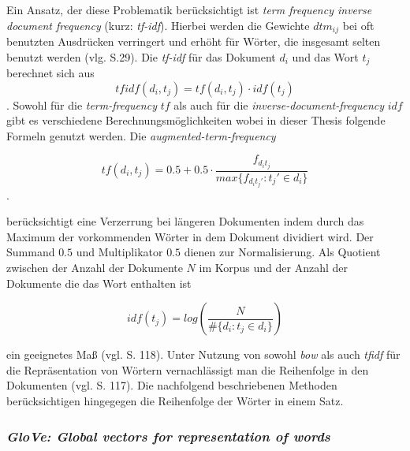 \documentclass[a4paper,11pt]{article}
\begin{document}
Ein Ansatz, der diese Problematik berücksichtigt ist \textit{term frequency inverse document frequency} (kurz: \textit{tf-idf}). Hierbei werden die Gewichte $dtm_{ij}$  bei oft benutzten Ausdrücken verringert und erhöht für Wörter, die insgesamt selten benutzt werden (vlg. \cite{textMiningR} S.29). Die \textit{tf-idf} für das Dokument $d_i$ und das Wort $t_j$ berechnet sich aus 
\[tfidf(d_i, t_j) = tf(d_i,t_j) \cdot idf(t_j)  \].
Sowohl für die \textit{term-frequency} $tf$ als auch für die \textit{inverse-document-frequency} $idf$ gibt es verschiedene Berechnungsmöglichkeiten wobei in dieser Thesis folgende Formeln genutzt werden.
Die \textit{augmented-term-frequency}

\[tf(d_i,t_j) = 0.5 +  0.5 \cdot \frac{f_{d_i t_j}}{max \{ f_{d_i t_j'}: t_j' \in d_i \}} \].

berücksichtigt eine Verzerrung bei längeren Dokumenten indem durch das Maximum der vorkommenden Wörter in dem Dokument dividiert wird. Der Summand $0.5$ und Multiplikator $0.5$ dienen zur Normalisierung. Als Quotient zwischen der Anzahl der Dokumente $N$ im Korpus und der Anzahl der Dokumente die das Wort enthalten ist

\[idf(t_j) = log(\frac{N}{\# \{d_i: t_j \in d_i \}}) \]

ein geeignetes Maß (vgl. \cite{deepEssentials} S. 118). Unter Nutzung von sowohl \textit{bow} als auch \textit{tfidf} für die Repräsentation von Wörtern vernachlässigt man die Reihenfolge in den Dokumenten (vgl. \cite{deepEssentials} S. 117). Die nachfolgend beschriebenen Methoden berücksichtigen hingegegen die Reihenfolge der Wörter in einem Satz.


\subsubsection{\textit{GloVe: Global vectors for representation of words}} \label{Kap:Glove}
\end{document}

